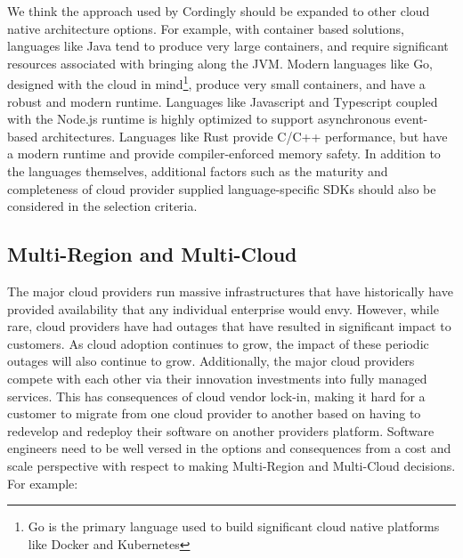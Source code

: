\documentclass[conference]{IEEEtran}
\begin{document}
We think the approach used by Cordingly should be expanded to other cloud native architecture options.  For example, with container based solutions, languages like Java tend to produce very large containers, and require significant resources associated with bringing along the JVM.  Modern languages like Go, designed with the cloud in mind\footnote{Go is the primary language used to build significant cloud native platforms like Docker and Kubernetes}, produce very small containers, and have a robust and modern runtime.  Languages like Javascript and Typescript coupled with the Node.js runtime is highly optimized to support asynchronous event-based architectures. Languages like Rust provide C/C++ performance, but have a modern runtime and provide compiler-enforced memory safety. In addition to the languages themselves, additional factors such as the maturity and completeness of cloud provider supplied language-specific SDKs should also be considered in the selection criteria. 

\subsection{Multi-Region and Multi-Cloud}
The major cloud providers run massive infrastructures that have historically have provided availability that any individual enterprise would envy. However, while rare, cloud providers have had outages that have resulted in significant impact to customers. As cloud adoption continues to grow, the impact of these periodic outages will also continue to grow.  Additionally, the major cloud providers compete with each other via their innovation investments into fully managed services.  This has consequences of cloud vendor lock-in, making it hard for a customer to migrate from one cloud provider to another based on having to redevelop and redeploy their software on another providers platform.  Software engineers need to be well versed in the options and consequences from a cost and scale perspective with respect to making Multi-Region and Multi-Cloud decisions. For example: 
\end{document}
